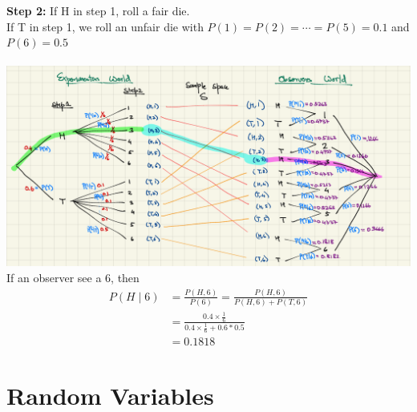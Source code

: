 \documentclass[11pt,oneside]{book}
\theoremstyle{break}
\theoremstyle{break}
\begin{document}
\text{\qquad} \textbf{Step 2:} If H in step 1, roll a fair die.\\
\text{\qquad} \text{\qquad} \text{\quad} If T in step 1, we roll an unfair die with $P(1)=P(2)=\cdots=P(5)=0.1$ and $P(6)=0.5$\\
\hfill\\
 \includegraphics[scale=0.7]{figures/example2}\\
 If an observer see a 6, then \begin{align*}
 P(H\mid 6)&=\frac{P(H,6)}{P(6)}=\frac{P(H,6)}{P(H,6)+P(T,6)}\\
 &=\frac{0.4\times \frac{1}{6}}{0.4\times \frac{1}{6}+0.6*0.5}\\
 &=0.1818
 \end{align*}
\newpage
\chapter[Random Variables]{Random Variables}
\end{document}
